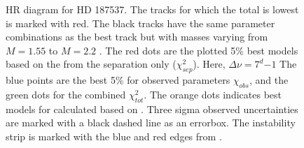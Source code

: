 \begin{figure}[htbp]
	\centering
	\caption{HR diagram for HD 187537. The tracks for which the total \chis is lowest is marked with red. The black tracks have the same parameter combinations as the best track but with masses varying from $M=1.55$ to $M=2.2$ \msun. The red dots are the plotted 5\% best models based on the \chis from the separation only ($\chi_{sep}^2$).  Here, $\Delta \nu = 7^d{-1}$ The blue points are the best 5\% for observed parameters $\chi_{obs}$, and the green dots for the combined $\chi_{tot}^2$. The orange dots indicates best models for \chis calculated based on \lum. Three sigma observed uncertainties are marked with a black dashed line as an errorbox. The instability strip is marked with the blue and red edges from \citet{murphy2019gaia}.}
	\label{finalsuper}
\end{figure}
